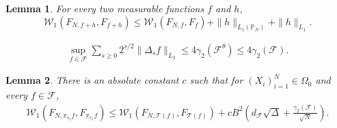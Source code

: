 \documentclass[10pt,a4paper]{amsart}
\newtheorem{lemma}{Lemma}
\renewcommand{\P}{\mathbb{P}}
\newcommand{\W}{\mathcal{W}}
\begin{document}
\begin{lemma}
\label{lem:W.f.plus.h}
	For every two measurable functions $f$ and $h$,
	\[ \W_{1}(F_{N,f+h}, F_{f+h} )
	\leq  \W_{1}(F_{N,f}, F_{f} ) +  \|h\|_{L_{1}(\P_{N})} + \|h\|_{L_{1}} . \] 
\end{lemma}

\begin{align}
\label{eq:almost.optioma.admissible.seq}
 \sup_{f\in\mathcal{F}} \sum_{s\geq 0} 2^{s/2} \| \Delta_{s} f \|_{L_{2}}
\leq 4 \gamma_{2}(\mathcal{F}^{\theta})
\leq 4 \gamma_{2}(\mathcal{F}).
\end{align}

\begin{lemma}
\label{lem:reduction.to.truncation}
There is an absolute constant $c$ such that for $(X_{i})_{i=1}^{N}\in\Omega_{0}$ and  every $f\in\mathcal{F}$,
\begin{align*}
 \W_{1}(F_{N,\pi_{s_{1}}f}, F_{\pi_{s_{1}}f}) 
\leq \W_{1}(F_{N,\mathcal{T}(f)}, F_{\mathcal{T}(f)} ) + cB^{2}\left(  d_{\mathcal{F}} \sqrt\Delta + \frac{\gamma_{2}(\mathcal{F})}{\sqrt N}\right).
\end{align*} 
\end{lemma}
\end{document}
